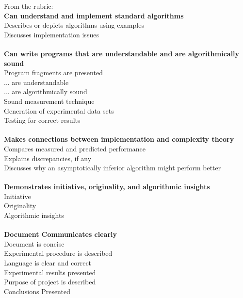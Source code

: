 \documentclass{article}
\begin{document}
\noindent
From the rubric:\\
\textbf{Can understand and implement standard algorithms}\\
Describes or depicts algorithms using examples\\
Discusses implementation issues\\
\\
\textbf{Can write programs that are understandable and are algorithmically sound}\\
Program fragments are presented\\
... are understandable\\
... are algorithmically sound\\
Sound measurement technique\\
Generation of experimental data sets\\
Testing for correct results\\
\\
\textbf{Makes connections between implementation and complexity theory}\\
Compares measured and predicted performance\\
Explains discrepancies, if any\\
Discusses why an asymptotically inferior algorithm might perform better\\
\\
\textbf{Demonstrates initiative, originality, and algorithmic insights}\\
Initiative\\
Originality\\
Algorithmic insights\\
\\
\textbf{Document Communicates clearly}\\
Document is concise \\
Experimental procedure is described \\
Language is clear and correct \\
Experimental results presented \\
Purpose of project is described \\
Conclusions Presented \\

\pagebreak


\end{document}
